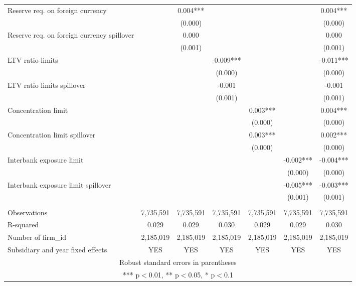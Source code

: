 \begin{tabular}{lcccccc}
Reserve req. on foreign currency &  & 0.004*** &  &  &  & 0.004*** \\
 &  & (0.000) &  &  &  & (0.000) \\
Reserve req. on foreign currency spillover &  & 0.000 &  &  &  & 0.000 \\
 &  & (0.001) &  &  &  & (0.001) \\
LTV ratio limits &  &  & -0.009*** &  &  & -0.011*** \\
 &  &  & (0.000) &  &  & (0.000) \\
LTV ratio limits spillover &  &  & -0.001 &  &  & -0.001 \\
 &  &  & (0.001) &  &  & (0.001) \\
Concentration limit &  &  &  & 0.003*** &  & 0.004*** \\
 &  &  &  & (0.000) &  & (0.000) \\
Concentration limit spillover &  &  &  & 0.003*** &  & 0.002*** \\
 &  &  &  & (0.000) &  & (0.000) \\
Interbank exposure limit &  &  &  &  & -0.002*** & -0.004*** \\
 &  &  &  &  & (0.000) & (0.000) \\
Interbank exposure limit spillover &  &  &  &  & -0.005*** & -0.003*** \\
 &  &  &  &  & (0.001) & (0.001) \\
 &  &  &  &  &  &  \\
Observations & 7,735,591 & 7,735,591 & 7,735,591 & 7,735,591 & 7,735,591 & 7,735,591 \\
R-squared & 0.029 & 0.029 & 0.030 & 0.029 & 0.029 & 0.030 \\
Number of firm\_id & 2,185,019 & 2,185,019 & 2,185,019 & 2,185,019 & 2,185,019 & 2,185,019 \\
 Subsidiary and year fixed effects & YES & YES & YES & YES & YES & YES \\ \hline
\multicolumn{7}{c}{ Robust standard errors in parentheses} \\
\multicolumn{7}{c}{ *** p$<$0.01, ** p$<$0.05, * p$<$0.1} \\
\end{tabular}
